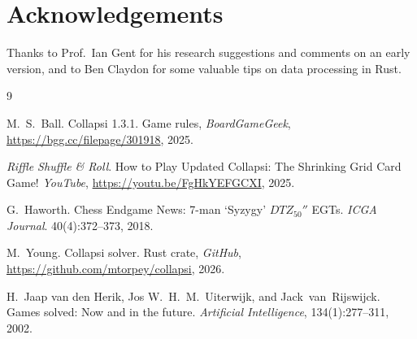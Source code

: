 \documentclass[a4paper, twocolumn]{article}
\begin{document}
\section{Acknowledgements}

Thanks to Prof.~Ian Gent for his research suggestions and comments on an early
version, and to Ben Claydon for some valuable tips on data processing in Rust.


\begin{thebibliography}{9}

  M.~S.~Ball.
  Collapsi 1.3.1.
  Game rules,
  \textit{BoardGameGeek},
  \url{https://bgg.cc/filepage/301918},
  2025.

  \textit{Riffle Shuffle \& Roll}.
  How to Play Updated Collapsi: The Shrinking Grid Card Game!
  \textit{YouTube},
  \url{https://youtu.be/FgHkYEFGCXI},
  2025.

  G.~Haworth.
  Chess Endgame News: 7-man `Syzygy' $DTZ_{50}''$ EGTs.
  \textit{ICGA Journal}. 40(4):372--373,
  2018.

  M.~Young.
  Collapsi solver.
  Rust crate,
  \textit{GitHub},
  \url{https://github.com/mtorpey/collapsi},
  2026.

  H.~Jaap van den Herik, Jos W.~H.~M.~Uiterwijk, and Jack~van~Rijswijck.
  Games solved: Now and in the future.
  \textit{Artificial Intelligence}, 134(1):277--311,
  2002.

\end{thebibliography}
\end{document}
